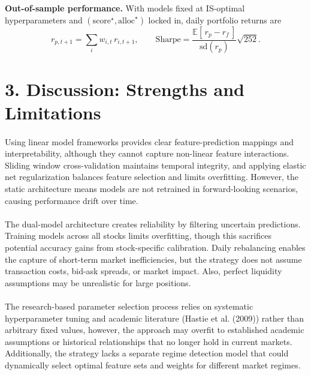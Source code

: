 \documentclass[11pt,a4paper]{article}
\begin{document}
    \medskip
    \textbf{Out-of-sample performance.}
    With models fixed at IS-optimal hyperparameters and $(\mathrm{score}^\star,\mathrm{alloc}^\star)$ locked in, daily portfolio returns are
    \[
        r_{p,t+1}=\sum_{i} w_{i,t}\, r_{i,t+1}, \qquad
        \mathrm{Sharpe}=\frac{\mathbb{E}[\,r_{p}-r_f\,]}{\mathrm{sd}(r_{p})}\sqrt{252}.
    \]

    \vspace{}
    \section*{3. Discussion: Strengths and Limitations}

    \paragraph{}Using linear model frameworks provides clear feature-prediction mappings and interpretability, although they cannot capture non-linear feature interactions. Sliding window cross-validation maintains temporal integrity, and applying elastic net regularization balances feature selection and limits overfitting. However, the static architecture means models are not retrained in forward-looking scenarios, causing performance drift over time.

    \paragraph{}
    The dual-model architecture creates reliability by filtering uncertain predictions. Training models across all stocks limits overfitting, though this sacrifices potential accuracy gains from stock-specific calibration. Daily rebalancing enables the capture of short-term market inefficiencies, but the strategy does not assume transaction costs, bid-ask spreads, or market impact. Also, perfect liquidity assumptions may be unrealistic for large positions.

    \paragraph{}
    The research-based parameter selection process relies on systematic hyperparameter tuning and academic literature (Hastie et al. (2009)) rather than arbitrary fixed values, however, the approach may overfit to established academic assumptions or historical relationships that no longer hold in current markets. Additionally, the strategy lacks a separate regime detection model that could dynamically select optimal feature sets and weights for different market regimes.
\end{document}
